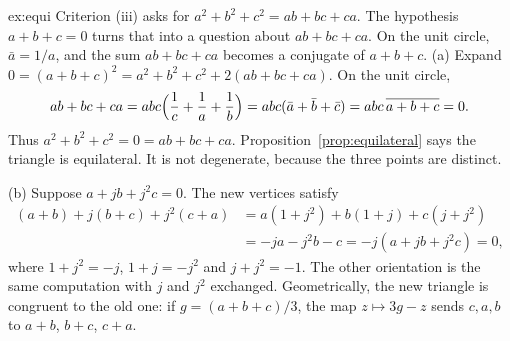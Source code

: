 \begin{solution}{ex:equi}
\idea Criterion (iii) asks for $a^2+b^2+c^2=ab+bc+ca$. The hypothesis $a+b+c=0$ turns that into a question about $ab+bc+ca$. On the unit circle, $\bar a=1/a$, and the sum $ab+bc+ca$ becomes a conjugate of $a+b+c$.
\writeup (a) Expand $0=(a+b+c)^2=a^2+b^2+c^2+2(ab+bc+ca)$. On the unit circle,
\[
ab+bc+ca=abc\Bigl(\frac1c+\frac1a+\frac1b\Bigr)=abc(\bar a+\bar b+\bar c)=abc\,\overline{a+b+c}=0.
\]
Thus $a^2+b^2+c^2=0=ab+bc+ca$. Proposition~\ref{prop:equilateral} says the triangle is equilateral. It is not degenerate, because the three points are distinct.

(b) Suppose $a+jb+j^2c=0$. The new vertices satisfy
\begin{align*}
(a+b)+j(b+c)+j^2(c+a)&=a(1+j^2)+b(1+j)+c(j+j^2)\\
&=-ja-j^2b-c=-j(a+jb+j^2c)=0,
\end{align*}
where $1+j^2=-j$, $1+j=-j^2$ and $j+j^2=-1$. The other orientation is the same computation with $j$ and $j^2$ exchanged. Geometrically, the new triangle is congruent to the old one: if $g=(a+b+c)/3$, the map $z\mapsto 3g-z$ sends $c,a,b$ to $a+b$, $b+c$, $c+a$.
\end{solution}

